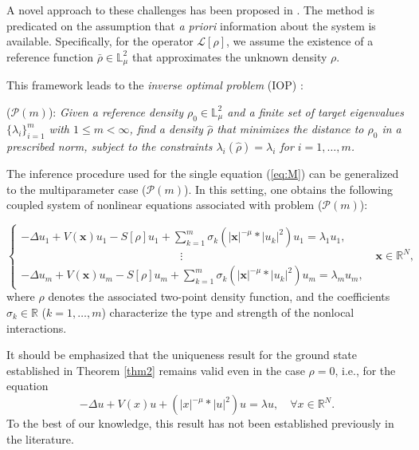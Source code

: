 \documentclass[12pt,thmsa]{article}
\begin{document}
A novel approach to these challenges has been proposed in \cite{ValIl_JDE}.
The method is predicated on the assumption that \emph{a priori} information
about the system is available. Specifically, for the operator $\mathcal{L}%
[\rho]$, we assume the existence of a reference function $\bar{\rho }\in
\mathbb{L}^2_{\mu}$ that approximates the unknown density $\rho$.

This framework leads to the \emph{inverse optimal problem} (IOP) \cite%
{ValIl_JDE, ValIl_PhysD}:

($\mathcal{P}(m)$): \textit{Given a reference density $\rho _{0}\in \mathbb{L%
}_{\mu }^{2}$ and a finite set of target eigenvalues $\{\lambda
_{i}\}_{i=1}^{m}$ with $1\leq m<\infty $, find a density $\hat{\rho}$ that
minimizes the distance to $\rho _{0}$ in a prescribed norm, subject to the
constraints $\lambda _{i}(\hat{\rho})=\lambda _{i}$ for $i=1,\dots ,m$.}

The inference procedure used for the single equation (\ref{eq:M}) can be
generalized to the multiparameter case ($\mathcal{P}(m)$). In this setting,
one obtains the following coupled system of nonlinear equations associated
with problem ($\mathcal{P}(m)$):

\begin{equation*}
\begin{cases}
-\Delta u_{1}+V(\mathbf{x})u_{1}-S[\rho ]u_{1}+\sum_{k=1}^{m}\sigma
_{k}\left( |\mathbf{x}|^{-\mu }\ast |u_{k}|^{2}\right) u_{1}=\lambda
_{1}u_{1}, \\[6pt]
\hspace{6cm}\vdots \\[6pt]
-\Delta u_{m}+V(\mathbf{x})u_{m}-S[\rho ]u_{m}+\sum_{k=1}^{m}\sigma
_{k}\left( |\mathbf{x}|^{-\mu }\ast |u_{k}|^{2}\right) u_{m}=\lambda
_{m}u_{m},%
\end{cases}%
\text{ }\mathbf{x}\in \mathbb{R}^{N},
\end{equation*}%
where $\rho $ denotes the associated two-point density function, and the
coefficients $\sigma _{k}\in \mathbb{R}$ ($k=1,\dots ,m$) characterize the
type and strength of the nonlocal interactions.

It should be emphasized that the uniqueness result for the ground state
established in Theorem \ref{thm2} remains valid even in the case $\rho =0$,
i.e., for the equation
\begin{equation*}
-\Delta u+V(x)u+\left( |x|^{-\mu }\ast |u|^{2}\right) u=\lambda u,\quad
\forall x\in \mathbb{R}^{N}.
\end{equation*}%
To the best of our knowledge, this result has not been established
previously in the literature.
\end{document}
